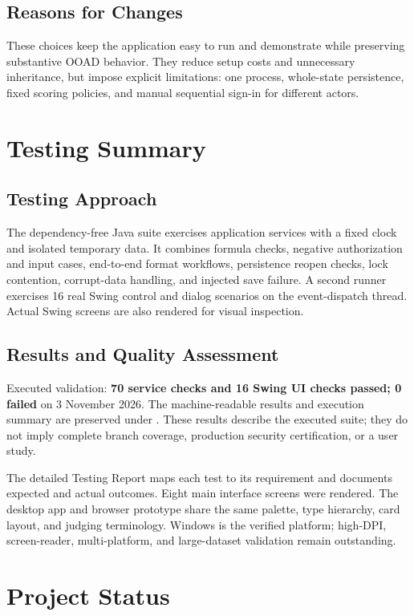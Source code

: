 \subsection{Reasons for Changes}
These choices keep the application easy to run and demonstrate while preserving substantive OOAD behavior. They reduce setup costs and unnecessary inheritance, but impose explicit limitations: one process, whole-state persistence, fixed scoring policies, and manual sequential sign-in for different actors.

\section{Testing Summary}
\subsection{Testing Approach}
The dependency-free Java suite exercises application services with a fixed clock and isolated temporary data. It combines formula checks, negative authorization and input cases, end-to-end format workflows, persistence reopen checks, lock contention, corrupt-data handling, and injected save failure. A second runner exercises 16 real Swing control and dialog scenarios on the event-dispatch thread. Actual Swing screens are also rendered for visual inspection.
\subsection{Results and Quality Assessment}
\begin{objectivebox}
Executed validation: \textbf{70 service checks and 16 Swing UI checks passed; 0 failed} on 3 November 2026. The machine-readable results and execution summary are preserved under . These results describe the executed suite; they do not imply complete branch coverage, production security certification, or a user study.
\end{objectivebox}
The detailed Testing Report maps each test to its requirement and documents expected and actual outcomes. Eight main interface screens were rendered. The desktop app and browser prototype share the same palette, type hierarchy, card layout, and judging terminology. Windows is the verified platform; high-DPI, screen-reader, multi-platform, and large-dataset validation remain outstanding.

\section{Project Status}
